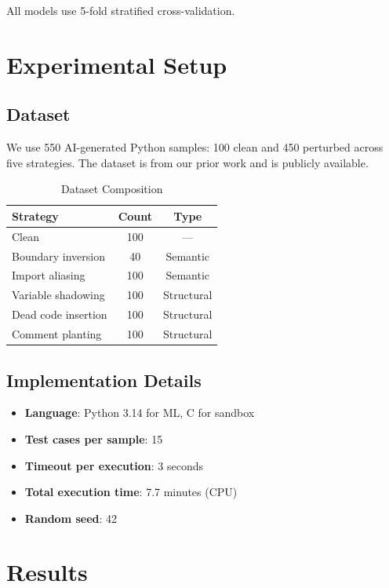 \documentclass[conference]{IEEEtran}
\begin{document}
All models use 5-fold stratified cross-validation.

\section{Experimental Setup}
\label{sec:setup}

\subsection{Dataset}

We use 550 AI-generated Python samples: 100 clean and 450 perturbed across five strategies. The dataset is from our prior work and is publicly available.

\begin{table}[h]
\centering
\caption{Dataset Composition}
\label{tab:dataset}
\begin{tabular}{@{}lcc@{}}
\toprule
\textbf{Strategy} & \textbf{Count} & \textbf{Type} \\
\midrule
Clean & 100 & --- \\
Boundary inversion & 40 & Semantic \\
Import aliasing & 100 & Semantic \\
Variable shadowing & 100 & Structural \\
Dead code insertion & 100 & Structural \\
Comment planting & 100 & Structural \\
\bottomrule
\end{tabular}
\end{table}

\subsection{Implementation Details}

\begin{itemize}
    \item \textbf{Language}: Python 3.14 for ML, C for sandbox
    \item \textbf{Test cases per sample}: 15
    \item \textbf{Timeout per execution}: 3 seconds
    \item \textbf{Total execution time}: 7.7 minutes (CPU)
    \item \textbf{Random seed}: 42
\end{itemize}


\section{Results}
\label{sec:results}
\end{document}
